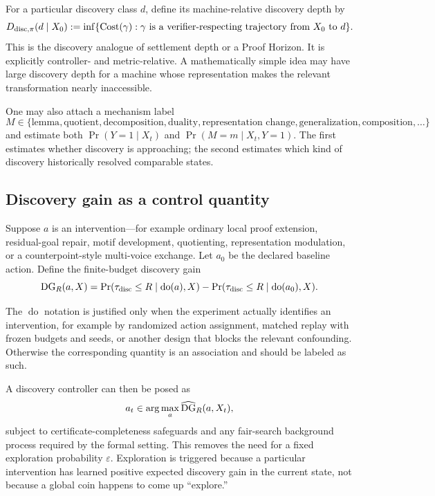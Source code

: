 For a particular discovery class $d$, define its machine-relative discovery depth by
\[
D_{\mathrm{disc},\pi}(d\mid X_0)
:=
\inf\{\operatorname{Cost}(\gamma):\gamma\text{ is a verifier-respecting trajectory from }X_0\text{ to }d\}.
\]
This is the discovery analogue of settlement depth or a Proof Horizon. It is explicitly controller- and metric-relative. A mathematically simple idea may have large discovery depth for a machine whose representation makes the relevant transformation nearly inaccessible.

One may also attach a mechanism label
\[
M\in\{\text{lemma},\text{quotient},\text{decomposition},\text{duality},\text{representation change},\text{generalization},\text{composition},\ldots\}
\]
and estimate both $\Pr(Y=1\mid X_t)$ and $\Pr(M=m\mid X_t,Y=1)$. The first estimates whether discovery is approaching; the second estimates which kind of discovery historically resolved comparable states.

\subsection{Discovery gain as a control quantity}
Suppose $a$ is an intervention---for example ordinary local proof extension, residual-goal repair, motif development, quotienting, representation modulation, or a counterpoint-style multi-voice exchange. Let $a_0$ be the declared baseline action. Define the finite-budget discovery gain
\[
\operatorname{DG}_R(a,X)
=
\Pr(\tau_{\mathrm{disc}}\le R\mid \operatorname{do}(a),X)
-
\Pr(\tau_{\mathrm{disc}}\le R\mid \operatorname{do}(a_0),X).
\]

\begin{caution}
The $\operatorname{do}$ notation is justified only when the experiment actually identifies an intervention, for example by randomized action assignment, matched replay with frozen budgets and seeds, or another design that blocks the relevant confounding. Otherwise the corresponding quantity is an association and should be labeled as such.
\end{caution}

A discovery controller can then be posed as
\[
a_t\in\arg\max_a\widehat{\operatorname{DG}}_R(a,X_t),
\]
subject to certificate-completeness safeguards and any fair-search background process required by the formal setting. This removes the need for a fixed exploration probability $\varepsilon$. Exploration is triggered because a particular intervention has learned positive expected discovery gain in the current state, not because a global coin happens to come up ``explore.''

